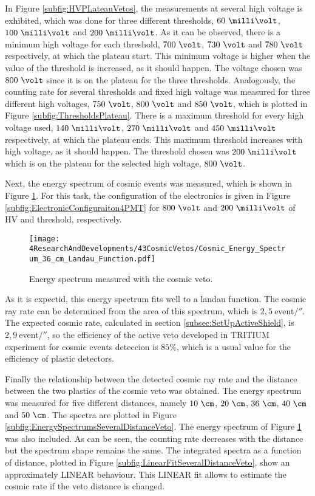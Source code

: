 In Figure \ref{subfig:HVPLateauVetos}, the measurements at several high voltage is exhibited, which was done for three different thresholds, $60~\milli\volt$, $100~\milli\volt$ and $200~\milli\volt$. As it can be observed, there is a minimum high voltage for each threshold, $700~\volt$, $730~\volt$ and $780~\volt$ respectively, at which the plateau start. This minimum voltage is higher when the value of the threshold is increased, as it should happen. The voltage chosen was $800~\volt$ since it is on the plateau for the three thresholds. Analogously, the counting rate for several thresholds and fixed high voltage was measured for three different high voltages, $750~\volt$, $800~\volt$ and $850~\volt$, which is plotted in Figure \ref{subfig:ThresholdsPlateau}. There is a maximum threshold for every high voltage used,  $140~\milli\volt$, $270~\milli\volt$ and $450~\milli\volt$ respectively, at which the plateau ends. This maximum threshold increases with high voltage, as it should happen. The threshold chosen was $200~\milli\volt$ which is on the plateau for the selected high voltage, $800~\volt$. 

Next, the energy spectrum of cosmic events was measured, which is shown in Figure \ref{fig:EnergySpectrumCosmicVeto}. For this task, the configuration of the electronics is given in Figure \ref{subfig:ElectronicConfiguraiton4PMT} for $800~\volt$ and $200~\milli\volt$ of HV and threshold, respectively. 

\begin{figure}[h]
\centering
\texttt{[image: 4ResearchAndDevelopments/43CosmicVetos/Cosmic\_Energy\_Spectrum\_36\_cm\_Landau\_Function.pdf]}
\caption{Energy spectrum measured with the cosmic veto.\label{fig:EnergySpectrumCosmicVeto}}
\end{figure}

As it is expectid, this energy spectrum fits well to a landau function. The cosmic ray rate can be determined from the area of this spectrum, which is $2,5~$event$/\second$. The expected cosmic rate, calculated in section \ref{subsec:SetUpActiveShield}, is $2,9~$event$/\second$, so the efficiency of the active veto developed in TRITIUM experiment for cosmic events deteccion is $85\%$, which is a usual value for the efficiency of plastic detectors.

Finally the relationship between the detected cosmic ray rate and the distance between the two plastics of the cosmic veto was obtained. The energy spectrum was measured for five different distances, namely $10~\cm$, $20~\cm$, $36~\cm$, $40~\cm$ and $50~\cm$. The spectra are plotted in Figure \ref{subfig:EnergySpectrumsSeveralDistanceVeto}. The energy spectrum of Figure \ref{fig:EnergySpectrumCosmicVeto} was also included. As can be seen, the counting rate decreases with the distance but the spectrum shape remains the same. The integrated spectra as a function of distance, plotted in Figure \ref{subfig:LinearFitSeveralDistanceVeto}, show an approximately LINEAR behaviour. This LINEAR fit allows to estimate the cosmic rate if the veto distance is changed.

